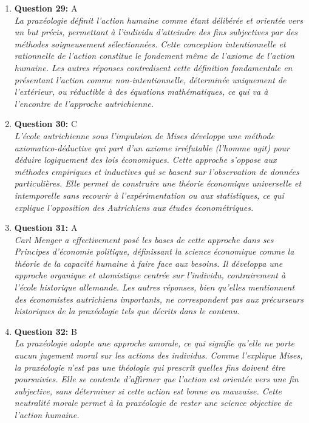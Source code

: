 \documentclass[12pt,a4paper]{article}
\begin{document}
\begin{enumerate}
\item \textbf{Question 29:} A
\\ \textit{La praxéologie définit l'action humaine comme étant délibérée et orientée vers un but précis, permettant à l'individu d'atteindre des fins subjectives par des méthodes soigneusement sélectionnées. Cette conception intentionnelle et rationnelle de l'action constitue le fondement même de l'axiome de l'action humaine. Les autres réponses contredisent cette définition fondamentale en présentant l'action comme non-intentionnelle, déterminée uniquement de l'extérieur, ou réductible à des équations mathématiques, ce qui va à l'encontre de l'approche autrichienne.}

\item \textbf{Question 30:} C
\\ \textit{L'école autrichienne sous l'impulsion de Mises développe une méthode axiomatico-déductive qui part d'un axiome irréfutable (l'homme agit) pour déduire logiquement des lois économiques. Cette approche s'oppose aux méthodes empiriques et inductives qui se basent sur l'observation de données particulières. Elle permet de construire une théorie économique universelle et intemporelle sans recourir à l'expérimentation ou aux statistiques, ce qui explique l'opposition des Autrichiens aux études économétriques.}

\item \textbf{Question 31:} A
\\ \textit{Carl Menger a effectivement posé les bases de cette approche dans ses Principes d'économie politique, définissant la science économique comme la théorie de la capacité humaine à faire face aux besoins. Il développa une approche organique et atomistique centrée sur l'individu, contrairement à l'école historique allemande. Les autres réponses, bien qu'elles mentionnent des économistes autrichiens importants, ne correspondent pas aux précurseurs historiques de la praxéologie tels que décrits dans le contenu.}

\item \textbf{Question 32:} B
\\ \textit{La praxéologie adopte une approche amorale, ce qui signifie qu'elle ne porte aucun jugement moral sur les actions des individus. Comme l'explique Mises, la praxéologie n'est pas une théologie qui prescrit quelles fins doivent être poursuivies. Elle se contente d'affirmer que l'action est orientée vers une fin subjective, sans déterminer si cette action est bonne ou mauvaise. Cette neutralité morale permet à la praxéologie de rester une science objective de l'action humaine.}


\end{enumerate}
\end{document}
